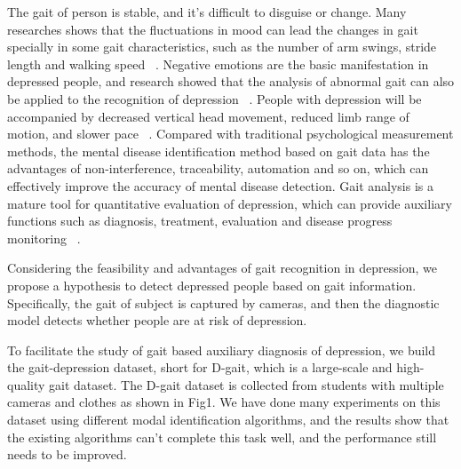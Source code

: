 \documentclass[10pt,twocolumn,letterpaper]{article}
\begin{document}
The gait of person is stable, and it’s difficult to disguise or change. Many researches shows that the fluctuations in mood can lead the changes in gait specially in some gait characteristics, such as the number of arm swings, stride length and walking speed~\cite{hicheur2013perception,montepare1987identification,roether2009critical,venture2014recognizing,gross2012effort,janssen2008recognition,kang2016effect,li2016emotion,li2016identifying,bhattacharya2020step} .
Negative emotions are the basic manifestation in depressed people, and research showed that the analysis of abnormal gait can also be applied to the recognition of depression ~\cite{michalak2009embodiment}. People with depression will be accompanied by decreased vertical head movement, reduced limb range of motion, and slower pace ~\cite{sloman1982gait,lemke2000spatiotemporal,bovi2011multiple,radovanovic2014gait,zhao2019see,yuan2018depression,fang2019depression,jing2019different}. 
Compared with traditional psychological measurement methods, the mental disease identification method based on gait data has the advantages of non-interference, traceability, automation and so on, which can effectively improve the accuracy of mental disease detection. Gait analysis is a mature tool for quantitative evaluation of depression, which can provide auxiliary functions such as diagnosis, treatment, evaluation and disease progress monitoring ~\cite{baker2016gait,wang2020gait,lu2021new,wang2021detecting,yang2022data}.


Considering the feasibility and advantages of gait recognition in depression, we propose a hypothesis to detect depressed people based on gait information. Specifically, the gait of subject is captured by cameras, and then the diagnostic model detects whether people are at risk of depression.


To facilitate the study of gait based auxiliary diagnosis of depression, we build the gait-depression dataset, short for D-gait, which is a large-scale and high-quality gait dataset. The D-gait dataset is collected from students with multiple cameras and clothes as shown in Fig1. We have done many experiments on this dataset using different modal identification algorithms, and the results show that the existing algorithms can’t complete this task well, and the performance still needs to be improved.
\end{document}
